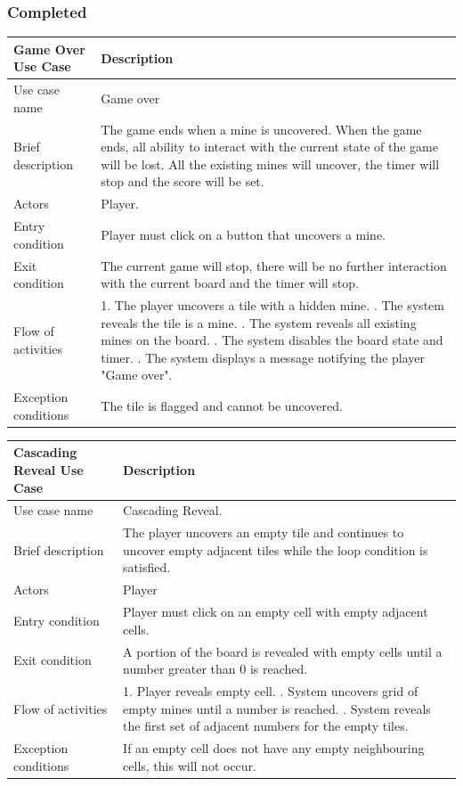 \documentclass[12pt, a4]{report}
\begin{document}
	\subsubsection{Completed}
	\begin{table}[ht]
	\begin{tabular}{|p{4cm}|p{12cm}|}
		\hline
		Game Over Use Case & Description \\
		\hline
		Use case name & Game over \\
		Brief description & The game ends when a mine is uncovered. When the game ends, all ability to interact with the current state of the game will be lost. All the existing mines will uncover, the timer will stop and the score will be set. \\
		Actors & Player. \\
		Entry condition & Player must click on a button that uncovers a mine. \\
		Exit condition & The current game will stop, there will be no further interaction with the current board and the timer will stop. \\
		Flow of activities & 1. The player uncovers a tile with a hidden mine. \newline 2. The system reveals the tile is a mine. \newline 3. The system reveals all existing mines on the board. \newline 4. The system disables the board state and timer. \newline 5. The system displays a message notifying the player "Game over". \\
		Exception conditions & The tile is flagged and cannot be uncovered.\\
		\hline
	\end{tabular}
	\end{table}
	\pagebreak
	\begin{table}[ht]
	\begin{tabular}{|p{4cm}|p{12cm}|}
		\hline
		Cascading Reveal Use Case & Description \\
		\hline
		Use case name & Cascading Reveal. \\
		Brief description & The player uncovers an empty tile and continues to uncover empty adjacent tiles while the loop condition is satisfied. \\
		Actors & Player \\
		Entry condition & Player must click on an empty cell with empty adjacent cells. \\
		Exit condition & A portion of the board is revealed with empty cells until a number greater than 0 is reached. \\
		Flow of activities & 1. Player reveals empty cell. \newline 2. System uncovers grid of empty mines until a number is reached. \newline 3. System reveals the first set of adjacent numbers for the empty tiles.\\
		Exception conditions & If an empty cell does not have any empty neighbouring cells, this will not occur.\\
		\hline
	\end{tabular}
	\end{table}
 
\end{document}

